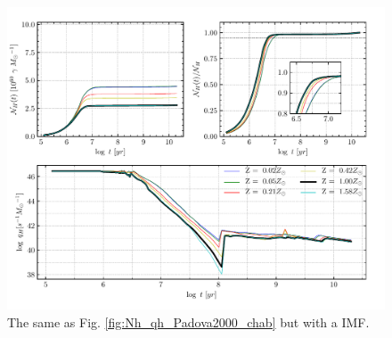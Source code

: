 \documentclass[12pt,letterpaper,usenatbib,useAMS]{article}
\begin{document}
\begin{figure}
    \includegraphics[width=\textwidth]{Nh_logt_metBase_Padova2000_salp.pdf}
    \caption{The same as Fig. \ref{fig:Nh_qh_Padova2000_chab} but with a \citet{Salpeter.1955a} IMF.}
    \label{fig:Nh_qh_Padova2000_salp}
\end{figure}
\end{document}
